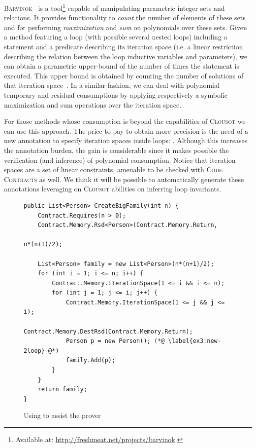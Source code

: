 \textsc{Barvinok}~\cite{clauss2009symbolic} is a tool\footnote{\small Available at: \url{http://freshmeat.net/projects/barvinok}.} capable of manipulating parametric integer sets and relations.  It provides functionality to \emph{count} the number of elements of these sets and for performing \emph{maximization} and \emph{sum} on polynomials over these sets. 
Given a method featuring a loop (with possible several nested loops) including a  statement  
and a predicate describing its iteration space (i.e. a linear restriction describing the relation between the loop inductive variables and parameters),  we can obtain a parametric upper-bound of the number of times the   statement is executed. This upper bound is obtained by counting the number of solutions of that iteration space~\cite{garber08ismm}. 
In a similar fashion, we can deal with polynomial temporary and residual consumptions by applying respectively a symbolic maximization and sum operations over the iteration space. 



For those methods whose consumption is beyond the capabilities of \textsc{Clousot} we can use this approach. The price to pay to obtain more precision is the need of a new annotation to specify iteration spaces inside loops: . Although this increases the annotation burden,  the gain is considerable since it makes possible the verification (and inference) of polynomial consumption. 
Notice that iteration spaces are a set of linear constraints, amenable to  be checked with \textsc{Code Contracts} as well.
We think it will be possible to automatically generate these annotations leveraging  on \textsc{Clousot} abilities on inferring loop invariants.

\begin{figure}[hbt]
\begin{scriptsize}
\begin{lstlisting}
public List<Person> CreateBigFamily(int n) {
	Contract.Requires(n > 0);
	Contract.Memory.Rsd<Person>(Contract.Memory.Return,
															n*(n+1)/2);

	List<Person> family = new List<Person>(n*(n+1)/2);
	for (int i = 1; i <= n; i++) {
		Contract.Memory.IterationSpace(1 <= i && i <= n);
		for (int j = 1; j <= i; j++) {
			Contract.Memory.IterationSpace(1 <= j && j <= i);
			Contract.Memory.DestRsd(Contract.Memory.Return);
			Person p = new Person(); (*@ \label{ex3:new-2loop} @*)
			family.Add(p);
		}
	}
	return family;
}
\end{lstlisting}
\end{scriptsize}
\vspace{-.5em}
\caption{Using  to assist the prover}
\vspace{-1.5em}
\label{ex3}
\end{figure}

